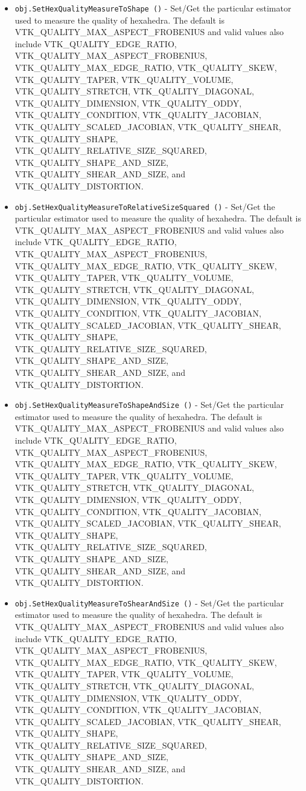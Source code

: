 \begin{itemize}
\item  \verb|obj.SetHexQualityMeasureToShape ()| -  Set/Get the particular estimator used to measure the quality of hexahedra.
 The default is VTK\_QUALITY\_MAX\_ASPECT\_FROBENIUS and valid values also include
 VTK\_QUALITY\_EDGE\_RATIO, VTK\_QUALITY\_MAX\_ASPECT\_FROBENIUS, 
 VTK\_QUALITY\_MAX\_EDGE\_RATIO, VTK\_QUALITY\_SKEW, VTK\_QUALITY\_TAPER, VTK\_QUALITY\_VOLUME,
 VTK\_QUALITY\_STRETCH, VTK\_QUALITY\_DIAGONAL, VTK\_QUALITY\_DIMENSION,
 VTK\_QUALITY\_ODDY, VTK\_QUALITY\_CONDITION, VTK\_QUALITY\_JACOBIAN,
 VTK\_QUALITY\_SCALED\_JACOBIAN, VTK\_QUALITY\_SHEAR, VTK\_QUALITY\_SHAPE,
 VTK\_QUALITY\_RELATIVE\_SIZE\_SQUARED, VTK\_QUALITY\_SHAPE\_AND\_SIZE,
 VTK\_QUALITY\_SHEAR\_AND\_SIZE, and VTK\_QUALITY\_DISTORTION.

\item  \verb|obj.SetHexQualityMeasureToRelativeSizeSquared ()| -  Set/Get the particular estimator used to measure the quality of hexahedra.
 The default is VTK\_QUALITY\_MAX\_ASPECT\_FROBENIUS and valid values also include
 VTK\_QUALITY\_EDGE\_RATIO, VTK\_QUALITY\_MAX\_ASPECT\_FROBENIUS, 
 VTK\_QUALITY\_MAX\_EDGE\_RATIO, VTK\_QUALITY\_SKEW, VTK\_QUALITY\_TAPER, VTK\_QUALITY\_VOLUME,
 VTK\_QUALITY\_STRETCH, VTK\_QUALITY\_DIAGONAL, VTK\_QUALITY\_DIMENSION,
 VTK\_QUALITY\_ODDY, VTK\_QUALITY\_CONDITION, VTK\_QUALITY\_JACOBIAN,
 VTK\_QUALITY\_SCALED\_JACOBIAN, VTK\_QUALITY\_SHEAR, VTK\_QUALITY\_SHAPE,
 VTK\_QUALITY\_RELATIVE\_SIZE\_SQUARED, VTK\_QUALITY\_SHAPE\_AND\_SIZE,
 VTK\_QUALITY\_SHEAR\_AND\_SIZE, and VTK\_QUALITY\_DISTORTION.

\item  \verb|obj.SetHexQualityMeasureToShapeAndSize ()| -  Set/Get the particular estimator used to measure the quality of hexahedra.
 The default is VTK\_QUALITY\_MAX\_ASPECT\_FROBENIUS and valid values also include
 VTK\_QUALITY\_EDGE\_RATIO, VTK\_QUALITY\_MAX\_ASPECT\_FROBENIUS, 
 VTK\_QUALITY\_MAX\_EDGE\_RATIO, VTK\_QUALITY\_SKEW, VTK\_QUALITY\_TAPER, VTK\_QUALITY\_VOLUME,
 VTK\_QUALITY\_STRETCH, VTK\_QUALITY\_DIAGONAL, VTK\_QUALITY\_DIMENSION,
 VTK\_QUALITY\_ODDY, VTK\_QUALITY\_CONDITION, VTK\_QUALITY\_JACOBIAN,
 VTK\_QUALITY\_SCALED\_JACOBIAN, VTK\_QUALITY\_SHEAR, VTK\_QUALITY\_SHAPE,
 VTK\_QUALITY\_RELATIVE\_SIZE\_SQUARED, VTK\_QUALITY\_SHAPE\_AND\_SIZE,
 VTK\_QUALITY\_SHEAR\_AND\_SIZE, and VTK\_QUALITY\_DISTORTION.

\item  \verb|obj.SetHexQualityMeasureToShearAndSize ()| -  Set/Get the particular estimator used to measure the quality of hexahedra.
 The default is VTK\_QUALITY\_MAX\_ASPECT\_FROBENIUS and valid values also include
 VTK\_QUALITY\_EDGE\_RATIO, VTK\_QUALITY\_MAX\_ASPECT\_FROBENIUS, 
 VTK\_QUALITY\_MAX\_EDGE\_RATIO, VTK\_QUALITY\_SKEW, VTK\_QUALITY\_TAPER, VTK\_QUALITY\_VOLUME,
 VTK\_QUALITY\_STRETCH, VTK\_QUALITY\_DIAGONAL, VTK\_QUALITY\_DIMENSION,
 VTK\_QUALITY\_ODDY, VTK\_QUALITY\_CONDITION, VTK\_QUALITY\_JACOBIAN,
 VTK\_QUALITY\_SCALED\_JACOBIAN, VTK\_QUALITY\_SHEAR, VTK\_QUALITY\_SHAPE,
 VTK\_QUALITY\_RELATIVE\_SIZE\_SQUARED, VTK\_QUALITY\_SHAPE\_AND\_SIZE,
 VTK\_QUALITY\_SHEAR\_AND\_SIZE, and VTK\_QUALITY\_DISTORTION.


\end{itemize}
